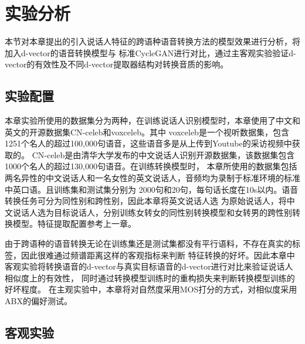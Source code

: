 \section{实验分析}
本节对本章提出的引入说话人特征的跨语种语音转换方法的模型效果进行分析，将加入d-vector的语音转换模型与
标准CycleGAN进行对比，通过主客观实验验证d-vector的有效性及不同d-vector提取器结构对转换音质的影响。
\subsection{实验配置}
本章实验所使用的数据集分为两种，在训练说话人识别模型时，本章使用了中文和英文的开源数据集CN-celeb和voxceleb。其中
voxceleb是一个视听数据集，包含1251个名人的超过100,000句语音，这些语音多是从上传到Youtube的采访视频中获取的。
CN-celeb是由清华大学发布的中文说话人识别开源数据集，该数据集包含1000个名人的超过130,000句语音。在训练转换模型时，
本章所使用的数据集包括两名异性的中文说话人和一名女性的英文说话人，音频均为录制于标准环境的标准中英口语。且训练集和测试集分别为
2000句和20句，每句话长度在10s以内。语音转换任务可分为同性别和跨性别，因此本章将英文说话人选
为原始说话人，将中文说话人选为目标说话人，分别训练女转女的同性别转换模型和女转男的跨性别转换模型。特征提取配置参考上一章。

由于跨语种的语音转换无论在训练集还是测试集都没有平行语料，不存在真实的标签，因此很难通过频谱距离这样的客观指标来判断
特征转换的好坏。因此本章中客观实验将转换语音的d-vector与真实目标语音的d-vector进行对比来验证说话人相似度上的有效性，
同时通过转换模型训练时的重构损失来判断转换模型训练的好坏程度。
在主观实验中，本章将对自然度采用MOS打分的方式，对相似度采用ABX的偏好测试。

\subsection{客观实验}



